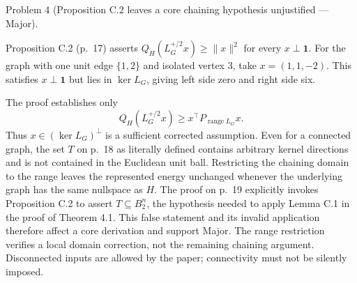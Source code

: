 \documentclass[10pt]{article}
\begin{document}
Problem 4 (Proposition C.2 leaves a core chaining hypothesis unjustified — Major).\par
Proposition C.2 (p. 17) asserts \(Q_H(L_G^{+/2}x)\ge\|x\|^2\) for every \(x\perp\mathbf1\). For the graph with one unit edge \(\{1,2\}\) and isolated vertex 3, take \(x=(1,1,-2)\). This satisfies \(x\perp\mathbf1\) but lies in \(\ker L_G\), giving left side zero and right side six.\par
The proof establishes only \[Q_H(L_G^{+/2}x)\ge x^\top P_{\operatorname{range}L_G}x.\] Thus \(x\in(\ker L_G)^\perp\) is a sufficient corrected assumption. Even for a connected graph, the set \(T\) on p. 18 as literally defined contains arbitrary kernel directions and is not contained in the Euclidean unit ball. Restricting the chaining domain to the range leaves the represented energy unchanged whenever the underlying graph has the same nullspace as \(H\). The proof on p. 19 explicitly invokes Proposition C.2 to assert \(T\subseteq B_2^n\), the hypothesis needed to apply Lemma C.1 in the proof of Theorem 4.1. This false statement and its invalid application therefore affect a core derivation and support Major. The range restriction verifies a local domain correction, not the remaining chaining argument. Disconnected inputs are allowed by the paper; connectivity must not be silently imposed.\par
\end{document}
